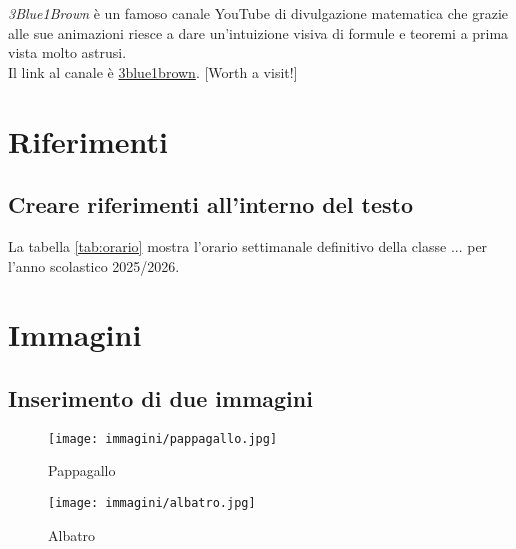 \documentclass[a4paper,11pt]{article}
\begin{document}
    \textit{3Blue1Brown} è un famoso canale YouTube di divulgazione matematica che grazie alle sue animazioni riesce a dare un'intuizione visiva di formule e teoremi a prima vista molto astrusi.\\
    Il link al canale è \href{https://www.3blue1brown.com/}{{\color{blue} 3blue1brown}}. [Worth a visit!]

    \section{Riferimenti}
    \subsection*{Creare riferimenti all'interno del testo}
    La tabella \ref{tab:orario} mostra l'orario settimanale definitivo della classe ... per l'anno scolastico 2025/2026.

    \section{Immagini}
    \subsection*{Inserimento di due immagini}
    \begin{figure}[h]
        \centering
        \begin{minipage}{0.45\textwidth}
            \centering
            \texttt{[image: immagini/pappagallo.jpg]}
            \caption{Pappagallo}
        \end{minipage}
        \hfill
        \begin{minipage}{0.45\textwidth}
            \centering
            \texttt{[image: immagini/albatro.jpg]}
            \caption{Albatro}
        \end{minipage}
    \end{figure}
\end{document}
